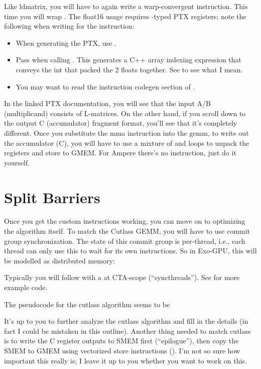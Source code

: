 Like ldmatrix, you will have to again write a warp-convergent instruction.
This time you will wrap .
The float16 usage requires -typed PTX registers; note the following when writing  for the instruction:
\begin{itemize}
  \item When generating the PTX, use .
  \item Pass  when calling .
    This generates a C++ array indexing expression that conveys the int that packed the 2 floats together.
    See  to see what I mean.
  \item You may want to read the instruction codegen section of .
\end{itemize}
In the linked PTX documentation, you will see that the input A/B (multiplicand) consists of L-matrices.
On the other hand, if you scroll down to the output C (accumulator) fragment format, you'll see that it's completely different.
Once you substitute the mma instruction into the gemm, to write out the accumulator (C), you will have to use a mixture of  and  loops to unpack the registers and store to GMEM.
For Ampere there's no  instruction, just do it yourself.

\section{Split Barriers}

Once you get the custom instructions working, you can move on to optimizing the algorithm itself.
To match the Cutlass GEMM, you will have to use commit group synchronization.
The state of this commit group is per-thread, i.e., each thread can only use this to wait for its own  instructions.
So in Exo-GPU, this will be modelled as distributed memory:



Typically you will follow with a  at CTA-scope (``syncthreads'').
See  for more example code.

The pseudocode for the cutlass algorithm seems to be



It's up to you to further analyze the cutlass algorithm and fill in the details (in fact I could be mistaken in this outline).
Another thing needed to match cutlass is to write the C register outputs to SMEM first (``epilogue''), then copy the SMEM to GMEM using vectorized store instructions ().
I'm not so sure how important this really is; I leave it up to you whether you want to work on this.


